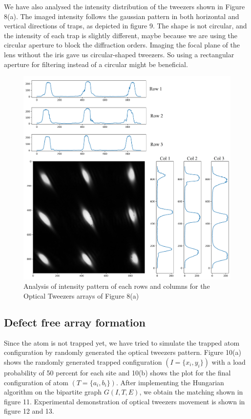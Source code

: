 \vspace{0.5 cm}
We have also analysed the intensity distribution of the tweezers shown in Figure 8(a). The imaged intensity follows the gaussian pattern in both horizontal and vertical directions of traps, as depicted in figure 9. The shape is not circular, and the intensity of each trap is slightly different, maybe because we are using the circular aperture to block the diffraction orders. Imaging the focal plane of the lens without the iris gave us circular-shaped tweezers. So using a rectangular aperture for filtering instead of a circular might be beneficial.

\begin{figure}[H]
\label{img:intensity analysis}
\centering
\includegraphics[width=\textwidth]{img/20220831_4_Profile.png}
\caption{Analysis of intensity pattern of each rows and columns for the Optical Tweezers arrays of Figure 8(a)}
\end{figure}
\vspace{1.1 cm}

\subsection{Defect free array formation}
\label{subsec: defect free array}
Since the atom is not trapped yet, we have tried to simulate the trapped atom configuration by randomly generated the optical tweezers pattern. Figure 10(a) shows the randomly generated trapped configuration $(I = \{x_i, y_i\})$ with a load probability of 50 percent for each site and 10(b) shows the plot for the final configuration of atom $(T = \{a_i, b_i\})$. After implementing the Hungarian algorithm on the bipartite graph $G(I, T, E)$, we obtain the matching shown in figure 11. Experimental demonstration of optical tweezers movement is shown in figure 12 and 13.

